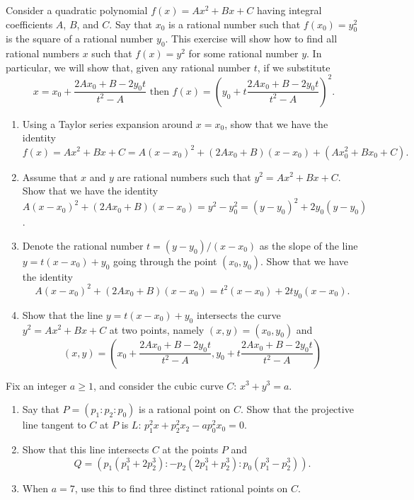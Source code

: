 \documentclass[12 pt, letterpaper]{hmcpset}
\begin{document}
\begin{problem}[1]
	Consider a quadratic polynomial $f(x) = Ax^{2} + Bx + C$ having integral coefficients $A$, $B$, and $C$. Say that  $x_{0}$ is a rational number such that $f(x_{0}) = y_{0}^{2}$ is the square of a rational number $y_{0}$. This exercise will show how to find all rational numbers $x$ such that $f(x) = y^{2}$ for some rational number $y$. In particular, we will show that, given any rational number $t$, if we substitute
	\[
		x = x_{0} + \frac{2 A x_{0} + B - 2 y_{0} t}{t^{2} - A} \text{ then } f(x) = \left ( y_{0} + t \frac{2 A x_{0} + B - 2 y_{0} t}{t^{2} - A} \right )^{2}.
	\]
	\begin{enumerate}
		\item Using a Taylor series expansion around $x = x_{0}$, show that we have the identity
			\[
				f(x) = A x^{2} + B x + C = A(x - x_{0})^{2} + (2 A x_{0} + B)(x - x_{0}) + (A x_{0}^{2} + B x_{0} + C).
			\]
		\item Assume that $x$ and $y$ are rational numbers such that $y^{2} = A x^{2} + B x + C$. Show that we have the identity $A(x - x_{0})^{2} + (2 A x_{0} + B)(x - x_{0}) = y^{2} - y_{0}^{2} = (y - y_{0})^{2} + 2 y_{0}(y - y_{0})$.
		\item Denote the rational number $t = (y - y_{0})/(x - x_{0})$ as the slope of the line $y = t (x - x_{0}) + y_{0}$ going through the point $(x_{0}, y_{0})$. Show that we have the identity
			\[
				A(x - x_{0})^{2} + (2 A x_{0} + B)(x - x_{0}) = t^{2}(x - x_{0}) + 2 t y_{0} (x - x_{0}).
			\]
		\item Show that the line $y = t(x - x_{0}) + y_{0}$ intersects the curve $y^{2} = A x^{2} + B x + C$ at two points, namely $(x, y) = (x_{0}, y_{0})$ and
			\[
				(x, y) = \left (  x_{0} + \frac{2 A x_{0} + B - 2 y_{0} t}{t^{2} - A}, y_{0} + t \frac{2 A x_{0} + B - 2 y_{0} t}{t^{2} - A} \right )
			\]
	\end{enumerate}
\end{problem}

\pagebreak

\begin{problem}[2]
	Fix an integer $a \ge 1$, and consider the cubic curve $C$: $x^{3} + y^{3} = a$.
	\begin{enumerate}
		\item Say that $P = (p_{1} : p_{2} : p_{0})$ is a rational point on $C$. Show that the projective line tangent to $C$ at $P$ is $L$: $p_{1}^{2} x + p_{2}^{2} x_{2} - a p_{0}^{2} x_{0} = 0$.
		\item Show that this line intersects $C$ at the points $P$ and
			\[
				Q = \left ( p_{1} (p_{1}^{3} + 2 p_{2}^{3}) : -p_{2} (2 p_{1}^{3} + p_{2}^{3}) : p_{0}(p_{1}^{3} - p_{2}^{3}) \right ).
			\]
		\item When $a = 7$, use this to find three distinct rational points on $C$.
	\end{enumerate}
\end{problem}
\end{document}
